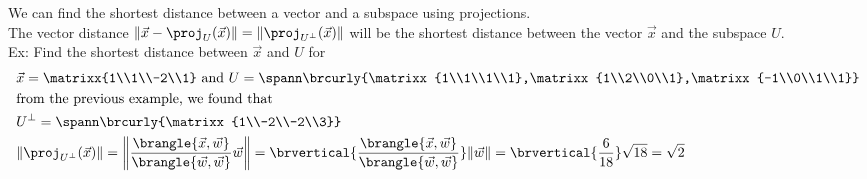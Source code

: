 We can find the shortest distance between a vector and a subspace using projections.\\
The vector distance $\|\vec{x}-\proj_U(\vec{x})\|=\|\proj_{U^\perp}(\vec{x})\|$ will be the shortest distance between the vector $\vec{x}$ and the subspace $U$.\\
Ex: Find the shortest distance between $\vec{x}$ and $U$ for
\begin{align*}
    &\vec{x}=\matrixx{1\\1\\-2\\1}\text{ and }U=\spann\brcurly{\matrixx{1\\1\\1\\1},\matrixx{1\\2\\0\\1},\matrixx{-1\\0\\1\\1}}\\
    &\text{from the previous example, we found that}\\
    &U^\perp=\spann\brcurly{\matrixx{1\\-2\\-2\\3}}\\
    &\|\proj_{U^\perp}(\vec{x})\|=\left\|\frac{\brangle{\vec{x},\vec{w}}}{\brangle{\vec{w},\vec{w}}}\vec{w}\right\|=\brvertical{\frac{\brangle{\vec{x},\vec{w}}}{\brangle{\vec{w},\vec{w}}}}\|\vec{w}\|=\brvertical{\frac{6}{18}}\sqrt{18}=\sqrt{2}
\end{align*}

